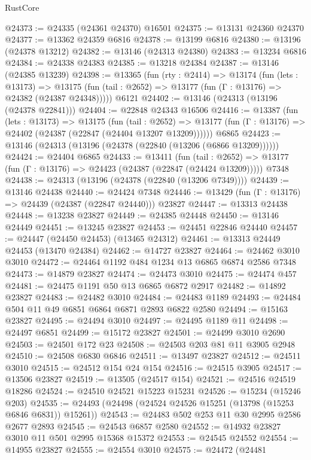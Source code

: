\begin{lexlean}{RustCore}
\begin{coremodule}
@24373 := @24335 (@24361 @24370) @16501
@24375 := @13131 @24360 @24370
@24377 := @13362 @24359 @6816
@24378 := @13199 @6816
@24380 := @13196 (@24378 @13212)
@24382 := @13146 (@24313 @24380)
@24383 := @13234 @6816
@24384 := @24338 @24383
@24385 := @13218 @24384
@24387 := @13146 (@24385 @13239)
@24398 := @13365
    (fun (rty : @2414) =>
    @13174
      (fun (lets : @13173) =>
      @13175 (fun (tail : @2652) => @13177 (fun (Γ : @13176) => @24382 (@24387 @24348)))))
    @6121
@24402 := @13146 (@24313 (@13196 (@24378 @22841)))
@24404 := @22848 @24343 @16506
@24416 := @13387
    (fun (lets : @13173) =>
    @13175
      (fun (tail : @2652) =>
      @13177 (fun (Γ : @13176) => @24402 (@24387 (@22847 (@24404 @13207 @13209))))))
    @6865
@24423 := @13146 (@24313 (@13196 (@24378 (@22840 (@13206 (@6866 @13209))))))
@24424 := @24404 @6865
@24433 := @13411
    (fun (tail : @2652) => @13177 (fun (Γ : @13176) => @24423 (@24387 (@22847 (@24424 @13209)))))
    @7348
@24438 := @24313 (@13196 (@24378 (@22840 (@13206 @7349))))
@24439 := @13146 @24438
@24440 := @24424 @7348
@24446 := @13429 (fun (Γ : @13176) => @24439 (@24387 (@22847 @24440))) @23827
@24447 := @13313 @24438
@24448 := @13238 @23827
@24449 := @24385 @24448
@24450 := @13146 @24449
@24451 := @13245 @23827
@24453 := @24451 @22846 @24440
@24457 := @24447 (@24450 @24453) (@13465 @24312)
@24461 := @13313 @24449 @24453 (@13470 @24384)
@24462 := @14727 @23827
@24464 := @24462 @3010 @3010
@24472 := @24464 @1192 @484 @1234 @13 @6865 @6874 @2586 @7348
@24473 := @14879 @23827
@24474 := @24473 @3010
@24475 := @24474 @457
@24481 := @24475 @1191 @50 @13 @6865 @6872 @2917
@24482 := @14892 @23827
@24483 := @24482 @3010
@24484 := @24483 @1189
@24493 := @24484 @504 @11 @49 @6851 @6864 @6871 @2893 @6822 @2580
@24494 := @15163 @23827
@24495 := @24494 @3010
@24497 := @24495 @1189 @11
@24498 := @24497 @6851
@24499 := @15172 @23827
@24501 := @24499 @3010 @2690
@24503 := @24501 @172 @23
@24508 := @24503 @203 @81 @11 @3905 @2948
@24510 := @24508 @6830 @6846
@24511 := @13497 @23827
@24512 := @24511 @3010
@24515 := @24512 @154 @24 @154
@24516 := @24515 @3905
@24517 := @13506 @23827
@24519 := @13505 (@24517 @154)
@24521 := @24516 @24519 @18286
@24524 := @24510 @24521 @15223 @15231
@24526 := @15234 (@15246 @203)
@24535 := @24493 (@24498 (@24524 @24526 @15251 (@13798 (@15253 @6846 @6831)) @15261))
@24543 := @24483 @502 @253 @11 @30 @2995 @2586 @2677 @2893
@24545 := @24543 @6857 @2580
@24552 := @14932 @23827 @3010 @11 @501 @2995 @15368 @15372
@24553 := @24545 @24552
@24554 := @14955 @23827
@24555 := @24554 @3010
@24575 := @24472
    (@24481

\end{coremodule}
\end{lexlean}
